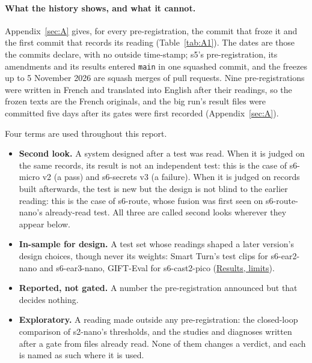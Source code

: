 \documentclass[10pt]{article}
\begin{document}
\paragraph{What the history shows, and what it cannot.} Appendix~\ref{sec:A} gives, for every pre-registration, the commit that froze it and the first commit that records its reading (Table~\ref{tab:A1}). The dates are those the commits declare, with no outside time-stamp; s5's pre-registration, its amendments and its results entered \texttt{main} in one squashed commit, and the freezes up to 5 November 2026 are squash merges of pull requests. Nine pre-registrations were written in French and translated into English after their readings, so the frozen texts are the French originals, and the big run's result files were committed five days after its gates were first recorded (Appendix~\ref{sec:A}).

Four terms are used throughout this report.

\begin{itemize}
\item \textbf{Second look.} A system designed after a test was read. When it is judged on the same records, its result is not an independent test: this is the case of s6-micro v2 (a pass) and s6-secrets v3 (a failure). When it is judged on records built afterwards, the test is new but the design is not blind to the earlier reading: this is the case of s6-route, whose fusion was first seen on s6-route-nano's already-read test. All three are called second looks wherever they appear below.
\item \textbf{In-sample for design.} A test set whose readings shaped a later version's design choices, though never its weights: Smart Turn's test clips for s6-ear2-nano and s6-ear3-nano, GIFT-Eval for s6-cast2-pico (\href{https://maxgfr.github.io/skycmd/results/\#status}{Results, limits}).
\item \textbf{Reported, not gated.} A number the pre-registration announced but that decides nothing.
\item \textbf{Exploratory.} A reading made outside any pre-registration: the closed-loop comparison of s2-nano's thresholds, and the studies and diagnoses written after a gate from files already read. None of them changes a verdict, and each is named as such where it is used.
\end{itemize}
\end{document}

